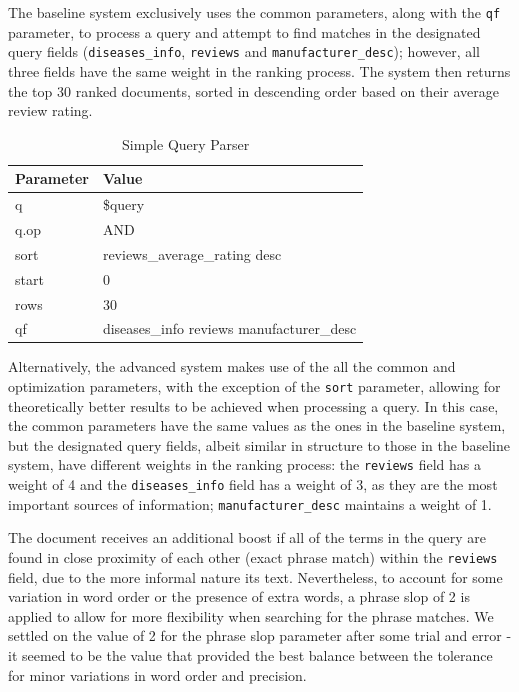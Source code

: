 \documentclass[sigconf]{acmart}
\begin{document}
The baseline system exclusively uses the common parameters, along with the \texttt{qf} parameter, to process a query and attempt to find matches in the designated query fields (\texttt{diseases\_info}, \texttt{reviews} and \texttt{manufacturer\_desc}); however, all three fields have the same weight in the ranking process. The system then returns the top 30 ranked documents, sorted in descending order based on their average review rating.

\begin{table}[H]
    \begin{tabular}{ll}
    \toprule
    Parameter & Value\\
    \midrule
    q & \$query\\
    q.op & AND\\
    sort & reviews\_average\_rating desc\\
    start & 0\\
    rows & 30\\
    qf & diseases\_info reviews manufacturer\_desc\\
    \bottomrule
    \end{tabular}
    \caption{Simple Query Parser}
    \label{tab:simple_query}
\end{table}

Alternatively, the advanced system makes use of the all the common and optimization parameters, with the exception of the \texttt{sort} parameter, allowing for theoretically better results to be achieved when processing a query. In this case, the common parameters have the same values as the ones in the baseline system, but the designated query fields, albeit similar in structure to those in the baseline system, have different weights in the ranking process: the \texttt{reviews} field has a weight of 4 and the \texttt{diseases\_info} field has a weight of 3, as they are the most important sources of information; \texttt{manufacturer\_desc} maintains a weight of 1.

The document receives an additional boost if all of the terms in the query are found in close proximity of each other (exact phrase match) within the \texttt{reviews} field, due to the more informal nature its text. Nevertheless, to account for some variation in word order or the presence of extra words, a phrase slop of 2 is applied to allow for more flexibility when searching for the phrase matches. We settled on the value of 2 for the phrase slop parameter after some trial and error - it seemed to be the value that provided the best balance between the tolerance for minor variations in word order and precision.
\end{document}
